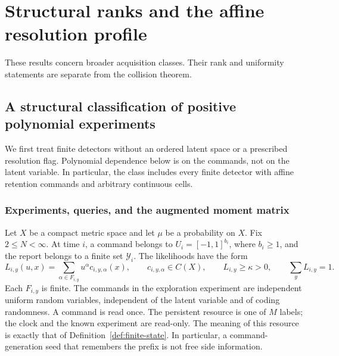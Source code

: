 \documentclass[11pt]{amsart}
\theoremstyle{definition}\newtheorem{definition}[theorem]{Definition}
\theoremstyle{remark}\newtheorem{remark}[theorem]{Remark}
\begin{document}
\section{Structural ranks and the affine resolution profile}
\label{app:structural}
These results concern broader acquisition classes. Their rank and
uniformity statements are separate from the collision theorem.
\begingroup
\let\section\subsection
\let\subsection\subsubsection
\let\subsubsection\paragraph
\section{A structural classification of positive polynomial experiments}
\label{sec:v18-structure}
We first treat finite detectors without an ordered latent space or a
prescribed resolution flag. Polynomial dependence below is on the commands,
not on the latent variable. In particular, the class includes every finite
detector with affine retention commands and arbitrary continuous cells.

\subsection{Experiments, queries, and the augmented moment matrix}
Let $X$ be a compact metric space and let $\mu$ be a probability on $X$.
Fix $2\le N<\infty$. At time $i$, a command belongs to
$U_i=[-1,1]^{b_i}$, where $b_i\ge1$, and the report belongs to a finite set $\mathcal Y_i$.
The likelihoods have the form
\begin{equation}\label{eq:v18-polynomial-detector}
 L_{i,y}(u,x)=\sum_{\alpha\in F_{i,y}}u^\alpha c_{i,y,\alpha}(x),
 \qquad c_{i,y,\alpha}\in C(X),\qquad
 L_{i,y}\ge\kappa>0,\qquad \sum_yL_{i,y}=1.
\end{equation}
Each $F_{i,y}$ is finite. The commands in the exploration experiment are
independent uniform random variables, independent of the latent variable
and of coding randomness. A command is read once. The persistent resource
is one of $M$ labels; the clock and the known experiment are read-only.
The meaning of this resource is exactly that of
Definition~\ref{def:finite-state}. In particular, a command-generation
seed that remembers the prefix is not free side information.
\end{document}
